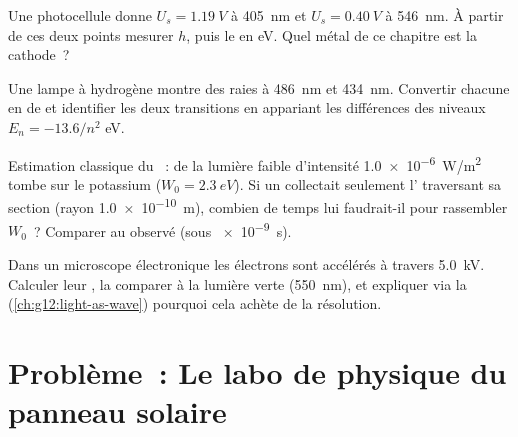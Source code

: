 \begin{exercise}[$\star\star\star$]\label{exo:g12:quantum-world:12}
Une photocellule donne $U_s = \qty{1.19}{V}$ à \qty{405}{nm} et
$U_s = \qty{0.40}{V}$ à \qty{546}{nm}. À partir de ces deux points
mesurer $h$, puis le  en
\unit{eV}. Quel métal de ce chapitre est la cathode~?
\end{exercise}

\begin{exercise}[$\star\star\star$]\label{exo:g12:quantum-world:13}
Une lampe à hydrogène montre des raies à \qty{486}{nm} et
\qty{434}{nm}. Convertir chacune en  de
 et identifier les deux transitions en
appariant les différences des niveaux $E_n = -13.6/n^2$ \unit{eV}.
\end{exercise}

\begin{exercise}[$\star\star\star$]\label{exo:g12:quantum-world:14}
Estimation classique du ~: de la lumière faible
d'intensité \qty{1.0e-6}{W/m^2} tombe sur le potassium
($W_0 = \qty{2.3}{eV}$). Si un 
collectait seulement l' traversant sa
section (rayon \qty{1.0e-10}{m}), combien de temps lui faudrait-il pour
rassembler $W_0$~? Comparer au  observé (sous
\qty{e-9}{s}).
\end{exercise}

\begin{exercise}[$\star\star\star$]\label{exo:g12:quantum-world:15}
Dans un microscope électronique les électrons sont accélérés à travers
\qty{5.0}{kV}. Calculer leur , la comparer à la lumière verte (\qty{550}{nm}), et expliquer
via la 
(\cref{ch:g12:light-as-wave}) pourquoi cela achète de la résolution.
\end{exercise}

\section{Problème~: Le labo de physique du panneau solaire}

